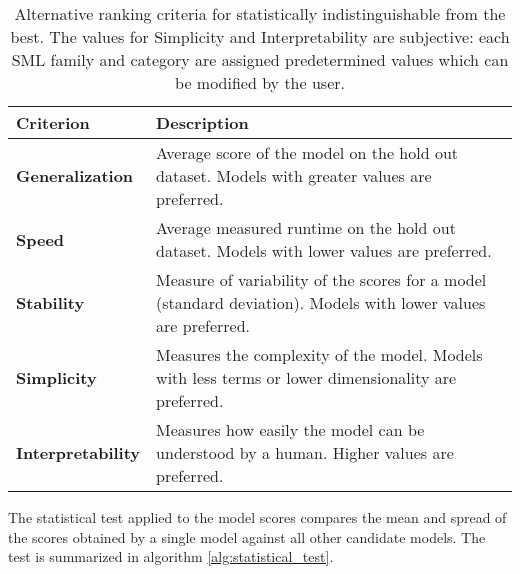 \begin{table}[here]
	\centering
	\begingroup
	\begin{tabularx}{\textwidth}{| l X |}
	\hline
	Criterion & Description \\
	\hline
	{\bf Generalization} & Average score of the model on the hold out dataset. Models with greater values
	are preferred.\\
	{\bf Speed} & Average measured runtime on the hold out dataset. Models with
	lower values are preferred.\\
	{\bf Stability} & Measure of variability of the scores for a model
	(standard deviation). Models with lower values are preferred. \\
	{\bf Simplicity} &  Measures the complexity of the model. Models with less terms or lower
	dimensionality are preferred.\\
	{\bf Interpretability} & Measures how easily the model can be understood by a human. Higher values are
	preferred.\\
	\hline
	\end{tabularx}
	\endgroup
	\caption[Alternative model ranking criteria]{Alternative ranking
	criteria for statistically indistinguishable from the best. 
	The values for Simplicity and Interpretability are subjective: each SML family and category are
	assigned predetermined values which can be modified by the user.
	}
	\label{tab:ranking}
\end{table}


%
%
%

The statistical test applied to the model scores compares the mean and spread of the scores
obtained by a single model against all other candidate models. The test is summarized in algorithm
\ref{alg:statistical_test}.

